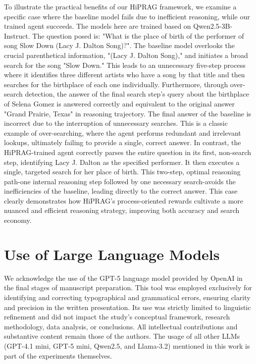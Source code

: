 \documentclass{article}
\begin{document}
To illustrate the practical benefits of our HiPRAG framework, we examine a specific case where the baseline model fails due to inefficient reasoning, while our trained agent succeeds. The models here are trained based on Qwen2.5-3B-Instruct. The question posed is: "What is the place of birth of the performer of song Slow Down (Lacy J. Dalton Song)?". The baseline model overlooks the crucial parenthetical information, "(Lacy J. Dalton Song)," and initiates a broad search for the song "Slow Down." This leads to an unnecessary five-step process where it identifies three different artists who have a song by that title and then searches for the birthplace of each one individually. Furthermore, through over-search detection, the answer of the final search step's query about the birthplace of Selena Gomez is answered correctly and equivalent to the original answer "Grand Prairie, Texas" in reasoning trajectory. The final answer of the baseline is incorrect due to the interruption of unnecessary searches. This is a classic example of over-searching, where the agent performs redundant and irrelevant lookups, ultimately failing to provide a single, correct answer. In contrast, the HiPRAG-trained agent correctly parses the entire question in its first, non-search step, identifying Lacy J. Dalton as the specified performer. It then executes a single, targeted search for her place of birth. This two-step, optimal reasoning path-one internal reasoning step followed by one necessary search-avoids the inefficiencies of the baseline, leading directly to the correct answer. This case clearly demonstrates how HiPRAG's process-oriented rewards cultivate a more nuanced and efficient reasoning strategy, improving both accuracy and search economy.

\clearpage
\section{Use of Large Language Models}
We acknowledge the use of the GPT-5 language model provided by OpenAI in the final stages of manuscript preparation. This tool was employed exclusively for identifying and correcting typographical and grammatical errors, ensuring clarity and precision in the written presentation. Its use was strictly limited to linguistic refinement and did not impact the study’s conceptual framework, research methodology, data analysis, or conclusions. All intellectual contributions and substantive content remain those of the authors. The usage of all other LLMs (GPT-4.1 mini, GPT-5 mini, Qwen2.5, and Llama-3.2) mentioned in this work is part of the experiments themselves.
\end{document}
